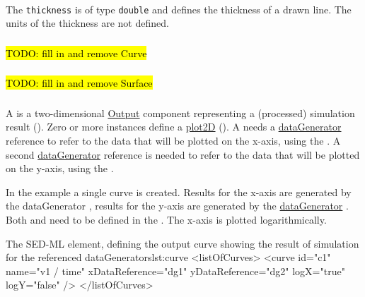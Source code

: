 \paragraph*{}
The {\tt thickness} is of type {\tt double} and defines the thickness of a drawn line. The units of the thickness are not defined.

\subsubsection{}
\label{class:axis}
\hl{TODO: fill in and remove Curve}

\subsubsection{}
\label{class:axis}
\hl{TODO: fill in and remove Surface}

\subsubsection{}
\label{class:curve}
A  is a two-dimensional \hyperref[class:output]{Output} component representing a (processed) simulation result (). Zero or more  instances define a \hyperref[class:plot2D]{plot2D} (). A  needs a \hyperref[class:dataGenerator]{dataGenerator} reference to refer to the data that will be plotted on the x-axis, using the \hyperref[sec:xDataReference]{}. A second \hyperref[class:dataGenerator]{dataGenerator} reference is needed to refer to the data that will be plotted on the y-axis, using the \hyperref[sec:yDataReference]{}. 

In the example a single curve is created. Results for the x-axis are generated by the dataGenerator , results for the y-axis are generated by the \hyperref[class:dataGenerator]{dataGenerator} . Both  and  need to be defined in the \hyperref[sec:listOfDataGenerators]{}. The x-axis is plotted logarithmically.
\begin{myXmlLst}{The SED-ML  element, defining the output curve showing the result of simulation for the referenced dataGenerators}{lst:curve}
<listOfCurves>
	<curve id="c1" name="v1 / time" xDataReference="dg1" yDataReference="dg2" logX="true" logY="false" />
</listOfCurves>
\end{myXmlLst}

